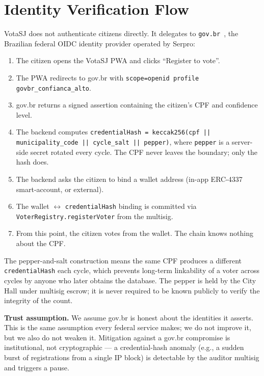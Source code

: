 \documentclass[12pt]{article}
\begin{document}
\section{Identity Verification Flow}
\label{sec:identity}

VotaSJ does not authenticate citizens directly. It delegates to
\texttt{gov.br}~\cite{govbrmanual}, the Brazilian federal OIDC identity
provider operated by Serpro:

\begin{enumerate}
  \item The citizen opens the VotaSJ PWA and clicks ``Register to vote''.
  \item The PWA redirects to gov.br with
        \texttt{scope=openid profile govbr\_confianca\_alto}.
  \item gov.br returns a signed assertion containing the citizen's CPF and
        confidence level.
  \item The backend computes \texttt{credentialHash =
        keccak256(cpf || municipality\_code || cycle\_salt || pepper)}, where
        \texttt{pepper} is a server-side secret rotated every cycle. The
        CPF never leaves the boundary; only the hash does.
  \item The backend asks the citizen to bind a wallet address (in-app
        ERC-4337~\cite{eip4337} smart-account, or external).
  \item The wallet \(\leftrightarrow\) \texttt{credentialHash} binding is
        committed via \texttt{VoterRegistry.registerVoter} from the multisig.
  \item From this point, the citizen votes from the wallet. The chain knows
        nothing about the CPF.
\end{enumerate}

The pepper-and-salt construction means the same CPF produces a different
\texttt{credentialHash} each cycle, which prevents long-term linkability of
a voter across cycles by anyone who later obtains the database. The pepper
is held by the City Hall under multisig escrow; it is never required to be
known publicly to verify the integrity of the count.

\textbf{Trust assumption.} We assume gov.br is honest about the identities
it asserts. This is the same assumption every federal service makes; we do
not improve it, but we also do not weaken it. Mitigation against a gov.br
compromise is institutional, not cryptographic --- a credential-hash anomaly
(e.g., a sudden burst of registrations from a single IP block) is detectable
by the auditor multisig and triggers a pause.
\end{document}
